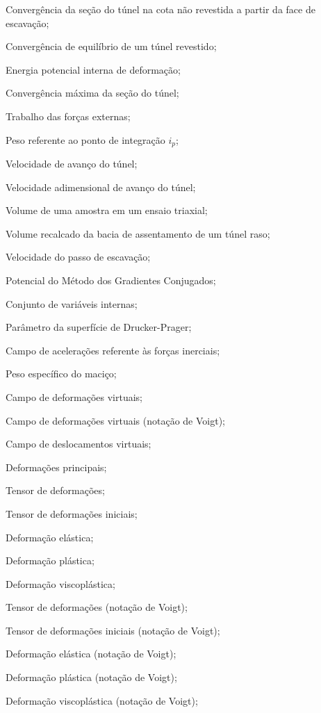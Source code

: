 \item[$ U_{0} $] 		Convergência da seção do túnel na cota não revestida a partir da face de escavação;
\item[$ U_{eq} $] 		Convergência de equilíbrio de um túnel revestido;
\item[$ U_{int} $] 		Energia potencial interna de deformação;
\item[$ U_{max} $] 		Convergência máxima da seção do túnel;
\item[$ W_{ext} $] 		Trabalho das forças externas;
\item[$ W_{i_p} $] 		Peso referente ao ponto de integração $i_p$;
\item[$ V $] 			Velocidade de avanço do túnel;
\item[$ V^* $] 			Velocidade adimensional de avanço do túnel;
\item[$ V_a $] 			Volume de uma amostra em um ensaio triaxial;
\item[$ V_{bacia} $]	Volume recalcado da bacia de assentamento de um túnel raso;
\item[$ V_{p} $]	Velocidade do passo de escavação;
\item[$V(\Delta \ul)$]	Potencial do Método dos Gradientes Conjugados;

\item[\textbf{Grego minúsculo:}]
\item[$\alphal$] Conjunto de variáveis internas;
\item[$\beta_1,\beta_2,\beta_3$] Parâmetro da superfície de Drucker-Prager;
\item[$ \gammal $] 		Campo de acelerações referente às forças inerciais;
\item[$\gamma_m$] 		Peso específico do maciço;
\item[$\dvarepsilonll$]		Campo de deformações virtuais;
\item[$\dvarepsilonl$]		Campo de deformações virtuais (notação de Voigt);
\item[$\dul$]		Campo de deslocamentos virtuais;
\item[$\varepsilon_1,\varepsilon_2,\varepsilon_3$] 	Deformações principais;
\item[$ \varepsilonll $] 	Tensor de deformações;
\item[$ \varepsilonll_I $] 	Tensor de deformações iniciais;
\item[$\varepsilonll^e$] Deformação elástica;
\item[$\varepsilonll^p$] Deformação plástica;
\item[$\varepsilonll^{vp}$] Deformação viscoplástica;
\item[$ \varepsilonl $] 	Tensor de deformações (notação de Voigt);
\item[$ \varepsilonl_I $] Tensor de deformações iniciais (notação de Voigt);
\item[$\varepsilonl^e$] Deformação elástica (notação de Voigt);
\item[$\varepsilonl^p$] Deformação plástica (notação de Voigt);
\item[$\varepsilonl^{vp}$] Deformação viscoplástica (notação de Voigt);


